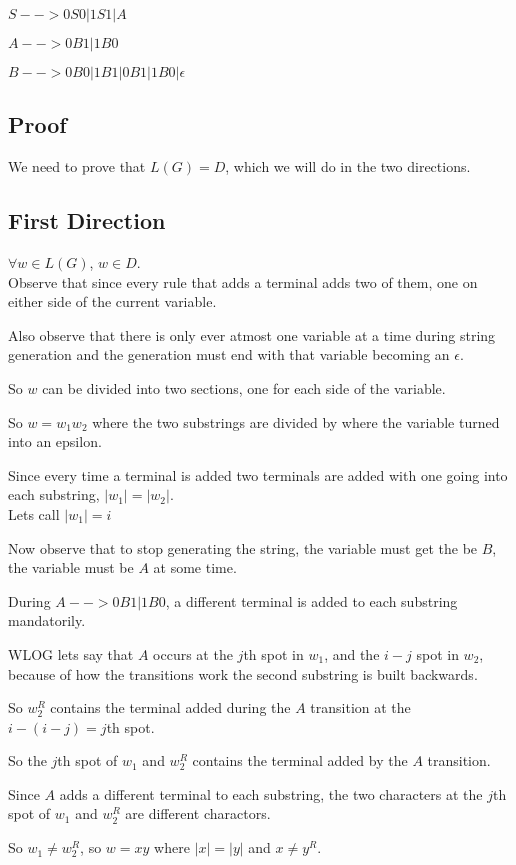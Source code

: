 \documentclass[letterpaper, 11pt]{article}
\begin{document}
$S --> 0S0|1S1|A$

$A --> 0B1|1B0$

$B --> 0B0|1B1|0B1|1B0|\epsilon$

\subsection*{Proof}
We need to prove that $L(G) = D$, which we will do in the two directions.
\subsection*{First Direction}
$\forall w \in L(G)$, $w \in D$.\\

Observe that since every rule that adds a terminal adds two of them, one on either side of the current variable.

Also observe that there is only ever atmost one variable at a time during string generation and the generation must end with that variable becoming an $\epsilon$.

So $w$ can be divided into two sections, one for each side of the variable.

So $w = w_1w_2$ where the two substrings are divided by where the variable turned into an epsilon.

Since every time a terminal is added two terminals are added with one going into each substring, $|w_1| = |w_2|$.\\

Lets call $|w_1| = i$

Now observe that to stop generating the string, the variable must get the be $B$, the variable must be $A$ at some time.

During $A --> 0B1|1B0$, a different terminal is added to each substring mandatorily.

WLOG lets say that $A$ occurs at the $j$th spot in $w_1$, and the $i-j$ spot in $w_2$, because of how the transitions work the second substring is built backwards.

So $w_2^R$ contains the terminal added during the $A$ transition at the $i-(i-j) = j$th spot.

So the $j$th spot of $w_1$ and $w_2^R$ contains the terminal added by the $A$ transition.

Since $A$ adds a different terminal to each substring, the two characters at the $j$th spot of $w_1$ and $w_2^R$ are different charactors.

So $w_1 \neq w_2^R$, so $w = xy$ where $|x| = |y|$ and $x \neq y^R$.
\end{document}
